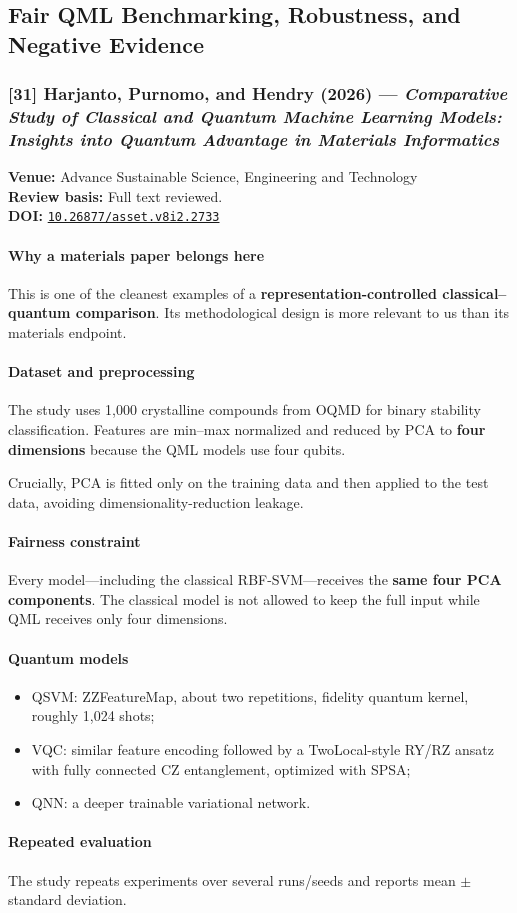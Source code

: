 \documentclass[11pt]{article}
\newcommand{\reviewfield}[2]{\paragraph{#1}#2}
\newcommand{\paperdoi}[1]{\href{https://doi.org/#1}{\texttt{#1}}}
\begin{document}
\subsection{Fair QML Benchmarking, Robustness, and Negative Evidence}

\subsubsection{[31] Harjanto, Purnomo, and Hendry (2026) --- \textit{Comparative Study of Classical and Quantum Machine Learning Models: Insights into Quantum Advantage in Materials Informatics}}
\textbf{Venue:} Advance Sustainable Science, Engineering and Technology\\
\textbf{Review basis:} Full text reviewed.\\
\textbf{DOI:} \paperdoi{10.26877/asset.v8i2.2733}

\reviewfield{Why a materials paper belongs here}{
This is one of the cleanest examples of a \textbf{representation-controlled classical--quantum comparison}. Its methodological design is more relevant to us than its materials endpoint.
}

\reviewfield{Dataset and preprocessing}{
The study uses 1,000 crystalline compounds from OQMD for binary stability classification. Features are min--max normalized and reduced by PCA to \textbf{four dimensions} because the QML models use four qubits.

Crucially, PCA is fitted only on the training data and then applied to the test data, avoiding dimensionality-reduction leakage.
}

\reviewfield{Fairness constraint}{
Every model---including the classical RBF-SVM---receives the \textbf{same four PCA components}. The classical model is not allowed to keep the full input while QML receives only four dimensions.
}

\reviewfield{Quantum models}{
\begin{itemize}
    \item QSVM: ZZFeatureMap, about two repetitions, fidelity quantum kernel, roughly 1,024 shots;
    \item VQC: similar feature encoding followed by a TwoLocal-style RY/RZ ansatz with fully connected CZ entanglement, optimized with SPSA;
    \item QNN: a deeper trainable variational network.
\end{itemize}
}

\reviewfield{Repeated evaluation}{
The study repeats experiments over several runs/seeds and reports mean $\pm$ standard deviation.
}
\end{document}
